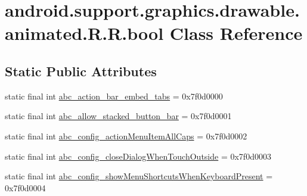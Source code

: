 \hypertarget{classandroid_1_1support_1_1graphics_1_1drawable_1_1animated_1_1_r_1_1bool}{
\section{android.support.graphics.drawable.animated.R.R.bool Class Reference}
\label{classandroid_1_1support_1_1graphics_1_1drawable_1_1animated_1_1_r_1_1bool}
}
\subsection*{Static Public Attributes}
\begin{CompactItemize}
\item 
static final int \hyperlink{classandroid_1_1support_1_1graphics_1_1drawable_1_1animated_1_1_r_1_1bool_ebd2dd1ec70c08029a1c74aa550bc73d}{abc\_\-action\_\-bar\_\-embed\_\-tabs} = 0x7f0d0000
\item 
static final int \hyperlink{classandroid_1_1support_1_1graphics_1_1drawable_1_1animated_1_1_r_1_1bool_e9bca82c8724ad67b022148f4a8b444f}{abc\_\-allow\_\-stacked\_\-button\_\-bar} = 0x7f0d0001
\item 
static final int \hyperlink{classandroid_1_1support_1_1graphics_1_1drawable_1_1animated_1_1_r_1_1bool_30341ce0c5dcfdd18ddf1b4dc185438d}{abc\_\-config\_\-actionMenuItemAllCaps} = 0x7f0d0002
\item 
static final int \hyperlink{classandroid_1_1support_1_1graphics_1_1drawable_1_1animated_1_1_r_1_1bool_bda6c23c5798c7b1577e899505ef1b48}{abc\_\-config\_\-closeDialogWhenTouchOutside} = 0x7f0d0003
\item 
static final int \hyperlink{classandroid_1_1support_1_1graphics_1_1drawable_1_1animated_1_1_r_1_1bool_e7a6726e461c916bb0430d57cff5effb}{abc\_\-config\_\-showMenuShortcutsWhenKeyboardPresent} = 0x7f0d0004
\end{CompactItemize}


